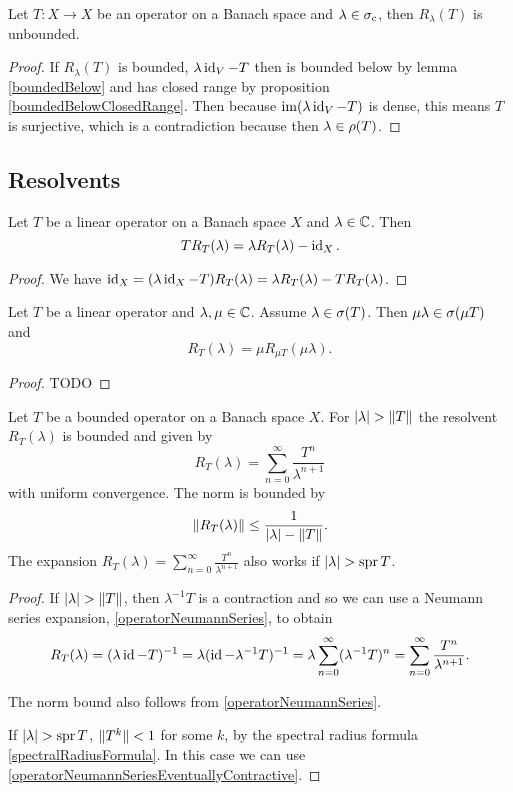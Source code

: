 \begin{proposition}
Let $T:X\to X$ be an operator on a Banach space and $\lambda\in\sigma_\text{c}$, then $R_\lambda(T)$ is unbounded.
\end{proposition}
\begin{proof}
If $R_\lambda(T)$ is bounded, $\lambda \operatorname{id}_V - T$ then is bounded below by lemma \ref{boundedBelow} and has closed range by proposition \ref{boundedBelowClosedRange}. Then because $\operatorname{im}(\lambda \operatorname{id}_V - T)$ is dense, this means $T$ is surjective, which is a contradiction because then $\lambda\in\rho(T)$.
\end{proof}

\subsection{Resolvents}

\begin{lemma}
Let $T$ be a linear operator on a Banach space $X$ and $\lambda\in\mathbb{C}$. Then
\[ TR_T(\lambda) = \lambda R_T(\lambda) - \operatorname{id}_X. \]
\end{lemma}
\begin{proof}
We have $\operatorname{id}_X = (\lambda \operatorname{id}_X - T)R_T(\lambda) = \lambda R_T(\lambda) - TR_T(\lambda)$.
\end{proof}

\begin{lemma}
Let $T$ be a linear operator and $\lambda,\mu\in\mathbb{C}$. Assume $\lambda\in \sigma(T)$. Then $\mu\lambda\in \sigma(\mu T)$ and
\[ R_T(\lambda) = \mu R_{\mu T}(\mu \lambda). \]
\end{lemma}
\begin{proof}
TODO
\end{proof}

\begin{proposition} \label{secondNeumannSeries}
Let $T$ be a bounded operator on a Banach space $X$. For $|\lambda|>\norm{T}$ the resolvent $R_T(\lambda)$ is bounded and given by
\[ R_T(\lambda) = \sum_{n=0}^\infty\frac{T^n}{\lambda^{n+1}} \]
with uniform convergence. The norm is bounded by
\[ \lVert R_T(\lambda)\rVert \leq \frac{1}{|\lambda|-\lVert T\rVert}. \]
The expansion $R_T(\lambda) = \sum_{n=0}^\infty\frac{T^n}{\lambda^{n+1}}$ also works if $|\lambda|>\spr{T}$.
\end{proposition}
\begin{proof}
If $|\lambda|>\norm{T}$, then $\lambda^{-1}T$ is a contraction and so we can use a Neumann series expansion, \ref{operatorNeumannSeries}, to obtain
\[ R_T(\lambda) = (\lambda\operatorname{id} - T)^{-1} = \lambda(\operatorname{id} - \lambda^{-1}T)^{-1} = \lambda \sum_{n=0}^\infty (\lambda^{-1}T)^n = \sum_{n=0}^\infty\frac{T^n}{\lambda^{n+1}}. \]

The norm bound also follows from \ref{operatorNeumannSeries}.

If $|\lambda|>\spr{T}$, $\lVert T^k\rVert < 1$ for some $k$, by the spectral radius formula \ref{spectralRadiusFormula}. In this case we can use \ref{operatorNeumannSeriesEventuallyContractive}.
\end{proof}

